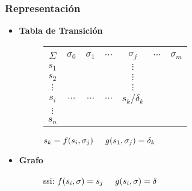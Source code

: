 \subsubsection{Representación}
\begin{itemize}
\item \textbf{Tabla de Transición} \\
\begin{figure}[h]
\centering
\begin{tabular}{|c|cccccc|}
    \hline
    \backslashbox{$k$}{\vspace{0.1pt}\\$\Sigma$} & $\sigma_0$ & $\sigma_1$ & $\cdots$ & $\sigma_j$ & $\cdots$ & $\sigma_m$\\ \hline
                $s_1$             &      &  &   &$\vdots$&&\\ 
                $s_2$             &      &  &  &$\vdots$&& \\ 
                $\vdots$             &      & &  & $\vdots$ &&\\ 
                $s_i$             &   $\cdots$   & $\cdots$  &$\cdots$  &$s_k/\delta_k$&&\\ 
                $\vdots$             &      &  &  &&& \\ 
                $s_n$             &      &  &  && &\\ \hline
\end{tabular} 
\caption{$s_k = f(s_i,\sigma_j)\hspace{0.5cm}g(s_1,\sigma_j)=\delta_k$}
\end{figure}
\item \textbf{Grafo} \\

\begin{figure}[h]
\centering
{}
\caption{ssi: $f(s_i,\sigma)=s_j \hspace{0.5cm} g(s_i,\sigma)=\delta$ }
\end{figure}
\end{itemize}
